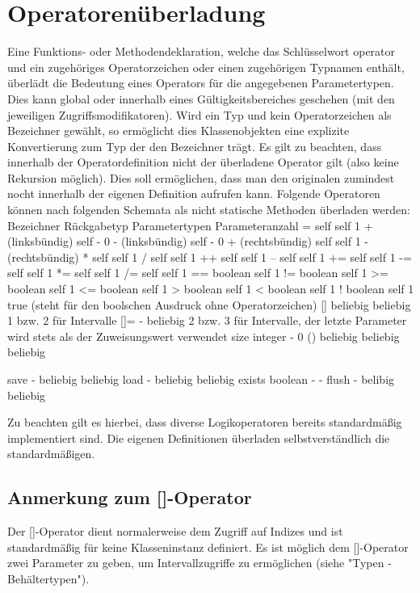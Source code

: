 \chapter{Operatorenüberladung}
Eine Funktions- oder Methodendeklaration, welche das Schlüsselwort operator und ein zugehöriges Operatorzeichen oder einen zugehörigen Typnamen enthält, überlädt die Bedeutung eines
Operators für die angegebenen Parametertypen.
Dies kann global oder innerhalb eines Gültigkeitsbereiches geschehen (mit den jeweiligen Zugriffsmodifikatoren).
Wird ein Typ und kein Operatorzeichen als Bezeichner gewählt, so ermöglicht dies Klassenobjekten eine explizite Konvertierung zum Typ der den Bezeichner trägt.
Es gilt zu beachten, dass innerhalb der Operatordefinition nicht der überladene Operator gilt (also keine Rekursion möglich). Dies soll ermöglichen,
dass man den originalen zumindest nocht innerhalb der eigenen Definition aufrufen kann.
Folgende Operatoren können nach folgenden Schemata als nicht statische Methoden überladen werden:
Bezeichner			Rückgabetyp			Parametertypen		Parameteranzahl
=				self				self			1
+ (linksbündig)			self				-			0
- (linksbündig)			self				-			0
+ (rechtsbündig)		self				self			1
- (rechtsbündig)
*				self				self			1
/				self				self			1
++				self				self			1
--				self				self			1
+=				self				self			1
-=				self				self			1
*=				self				self			1
/=				self				self			1
==				boolean				self			1
!=				boolean				self			1
>=				boolean				self			1
<=				boolean				self			1
>				boolean				self			1
<				boolean				self			1
!				boolean				self			1
true (steht für den boolschen Ausdruck ohne Operatorzeichen)
[]				beliebig			beliebig		1 bzw. 2 für Intervalle
[]=				-				beliebig		2 bzw. 3 für Intervalle, der letzte Parameter wird stets als der Zuweisungswert verwendet
size				integer				-			0
()				beliebig			beliebig		beliebig

save				-				beliebig		beliebig
load				-				beliebig		beliebig
exists				boolean				-			-
flush				-				belibig			beliebig

Zu beachten gilt es hierbei, dass diverse Logikoperatoren bereits standardmäßig implementiert sind.
Die eigenen Definitionen überladen selbstverständlich die standardmäßigen.

\section{Anmerkung zum []-Operator}
Der []-Operator dient normalerweise dem Zugriff auf Indizes und ist standardmäßig für keine Klasseninstanz definiert.
Es ist möglich dem []-Operator zwei Parameter zu geben, um Intervallzugriffe zu ermöglichen (siehe "Typen - Behältertypen").

